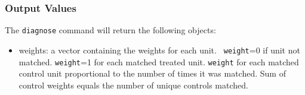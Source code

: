 \documentclass[oneside,letterpaper,titlepage]{article}
\begin{document}
\begin{appendix}
\subsubsection{Output Values}
The \texttt{diagnose} command will return the following objects: 
\begin{itemize}
\item{weights}: a vector containing the weights for each unit.  {\tt
    weight}=0 if unit not matched.  {\tt weight}=1 for each matched
  treated unit.  {\tt weight} for each matched control unit
  proportional to the number of times it was matched.  Sum of control
  weights equals the number of unique controls matched.
\end{itemize}

\end{appendix}





\printindex
\end{document}

